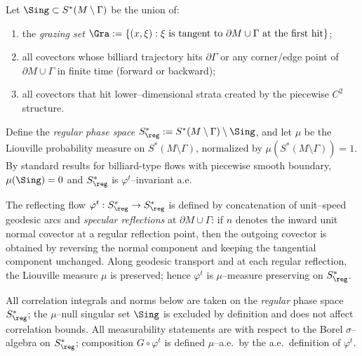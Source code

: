 \begin{hypothesis}
\begin{definition}\label{def:regular-phase}
Let $\Sing\subset S^*(M\setminus\Gamma)$ be the union of:
\begin{enumerate}
\item the \emph{grazing set} $\Gra := \{(x,\xi): \xi \text{ is tangent to } \partial M\cup\Gamma \text{ at the first hit}\}$;
\item all covectors whose billiard trajectory hits $\partial\Gamma$ or any corner/edge point of $\partial M\cup\Gamma$ in finite time (forward or backward);
\item all covectors that hit lower–dimensional strata created by the piecewise $C^2$ structure.
\end{enumerate}
Define the \emph{regular phase space} $S^*_{\reg}:=S^*(M\setminus\Gamma)\setminus \Sing$, and let $\mu$ be the Liouville probability measure on $S^*(M\setminus\Gamma)$, normalized by $\mu(S^*(M\setminus\Gamma))=1$.
By standard results for billiard-type flows with piecewise smooth boundary, $\mu(\Sing)=0$ and $S^*_{\reg}$ is $\varphi^t$–invariant a.e.
\end{definition}

\begin{definition}\label{def:billiard-flow}
The reflecting flow $\varphi^t:S^*_{\reg}\to S^*_{\reg}$ is defined by concatenation of unit–speed geodesic arcs and \emph{specular reflections} at $\partial M\cup\Gamma$:
if $n$ denotes the inward unit normal covector at a regular reflection point, then the outgoing covector is obtained by reversing the normal component and keeping the tangential component unchanged.
Along geodesic transport and at each regular reflection, the Liouville measure $\mu$ is preserved; hence $\varphi^t$ is $\mu$–measure preserving on $S^*_{\reg}$.
\end{definition}

\begin{remark}\label{rem:scope-correlations}
All correlation integrals and norms below are taken on the \emph{regular} phase space $S^*_{\reg}$; the $\mu$–null singular set $\Sing$ is excluded by definition and does not affect correlation bounds.
All measurability statements are with respect to the Borel $\sigma$–algebra on $S^*_{\reg}$; composition $G\circ\varphi^t$ is defined $\mu$–a.e.\ by the a.e.\ definition of $\varphi^t$.
\end{remark}


\end{hypothesis}
